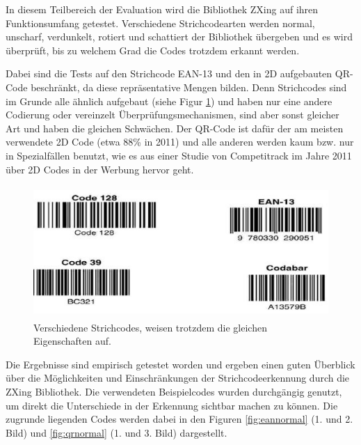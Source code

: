 \writtenby{\dcauthornameriren}%
In diesem Teilbereich der Evaluation wird die Bibliothek ZXing auf ihren Funktionsumfang getestet.
Verschiedene Strichcodearten werden normal, unscharf, verdunkelt, rotiert und schattiert der Bibliothek übergeben und es wird überprüft, bis zu welchem Grad die Codes trotzdem erkannt werden.

Dabei sind die Tests auf den Strichcode EAN-13 und den in 2D aufgebauten QR-Code beschränkt, da diese repräsentative Mengen bilden. Denn Strichcodes sind im Grunde alle ähnlich aufgebaut (siehe Figur \ref*{fig:similarcodes}) und haben nur eine andere Codierung oder vereinzelt Überprüfungsmechanismen, sind aber sonst gleicher Art und haben die gleichen Schwächen. Der QR-Code ist dafür der am meisten verwendete 2D Code (etwa 88\% in 2011) und alle anderen werden kaum bzw. nur in Spezialfällen benutzt, wie es aus einer Studie von Competitrack im Jahre 2011 über 2D Codes in der Werbung hervor geht.

\begin{figure}[H]
  \centering
  \includegraphics[height=5cm]{img/EAN13/strichcodes.jpg}
  \caption{Verschiedene Strichcodes, weisen trotzdem die gleichen Eigenschaften auf.}
  \label{fig:similarcodes}
\end{figure}

Die Ergebnisse sind empirisch getestet worden und ergeben einen guten Überblick über die Möglichkeiten und Einschränkungen der Strichcodeerkennung durch die ZXing Bibliothek. Die verwendeten Beispielcodes wurden durchgängig genutzt, um direkt die Unterschiede in der Erkennung sichtbar machen zu können. Die zugrunde liegenden Codes werden dabei in den Figuren \ref*{fig:eannormal} (1. und 2. Bild) und \ref*{fig:qrnormal} (1. und 3. Bild) dargestellt.
